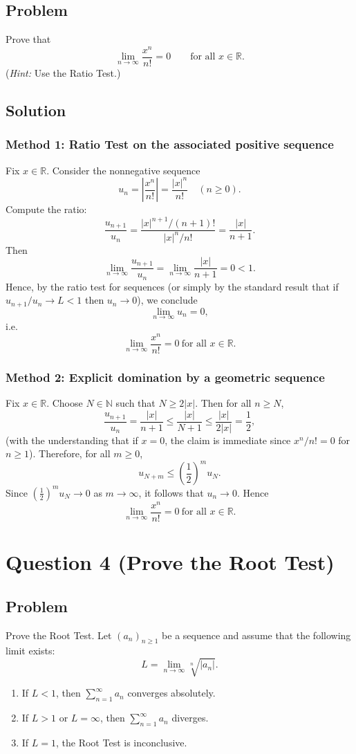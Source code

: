 \documentclass[12pt]{article}
\newcommand{\N}{\mathbb{N}}
\newcommand{\R}{\mathbb{R}}
\begin{document}
\subsection*{Problem}
Prove that
\[
\lim_{n\to\infty} \frac{x^n}{n!}=0 \qquad \text{for all }x\in\R.
\]
(\emph{Hint:} Use the Ratio Test.)

\subsection*{Solution}

\subsubsection*{Method 1: Ratio Test on the associated positive sequence}
Fix \(x\in\R\). Consider the nonnegative sequence
\[
u_n=\left|\frac{x^n}{n!}\right|=\frac{|x|^n}{n!}\quad(n\ge 0).
\]
Compute the ratio:
\[
\frac{u_{n+1}}{u_n}
=\frac{|x|^{n+1}/(n+1)!}{|x|^n/n!}
=\frac{|x|}{n+1}.
\]
Then
\[
\lim_{n\to\infty}\frac{u_{n+1}}{u_n}=\lim_{n\to\infty}\frac{|x|}{n+1}=0<1.
\]
Hence, by the ratio test for sequences (or simply by the standard result that if \(u_{n+1}/u_n\to L<1\) then \(u_n\to 0\)), we conclude
\[
\lim_{n\to\infty}u_n=0,
\]
i.e.
\[
\boxed{\lim_{n\to\infty}\frac{x^n}{n!}=0\ \text{for all }x\in\R.}
\]

\subsubsection*{Method 2: Explicit domination by a geometric sequence}
Fix \(x\in\R\). Choose \(N\in\N\) such that \(N\ge 2|x|\). Then for all \(n\ge N\),
\[
\frac{u_{n+1}}{u_n}=\frac{|x|}{n+1}\le \frac{|x|}{N+1}\le \frac{|x|}{2|x|}=\frac12,
\]
(with the understanding that if \(x=0\), the claim is immediate since \(x^n/n!=0\) for \(n\ge 1\)).
Therefore, for all \(m\ge 0\),
\[
u_{N+m}\le \left(\frac12\right)^m u_N.
\]
Since \(\left(\frac12\right)^m u_N\to 0\) as \(m\to\infty\), it follows that \(u_n\to 0\). Hence
\[
\boxed{\lim_{n\to\infty}\frac{x^n}{n!}=0\ \text{for all }x\in\R.}
\]

\newpage
\section*{Question 4 (Prove the Root Test)}
\subsection*{Problem}
Prove the Root Test. Let \((a_n)_{n\ge 1}\) be a sequence and assume that the following limit exists:
\[
L=\lim_{n\to\infty}\sqrt[n]{|a_n|}.
\]
\begin{enumerate}[label=(\roman*)]
  \item If \(L<1\), then \(\sum_{n=1}^\infty a_n\) converges absolutely.
  \item If \(L>1\) or \(L=\infty\), then \(\sum_{n=1}^\infty a_n\) diverges.
  \item If \(L=1\), the Root Test is inconclusive.
\end{enumerate}
\end{document}
